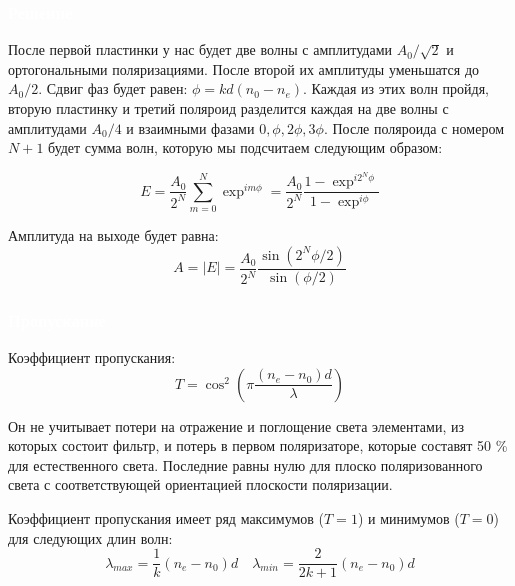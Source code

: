 \documentclass[aspectratio=169]{beamer}
\begin{document}
\begin{frame}
\frametitle{\textcolor{white}{Решение}}
После первой пластинки у нас будет две волны с амплитудами $A_0 /\sqrt2$ и ортогональными поляризациями. После второй их амплитуды уменьшатся до $A_0 / 2$. Сдвиг фаз будет равен: $\phi = kd(n_0 - n_e)$. Каждая из этих волн пройдя, вторую пластинку и третий поляроид разделится каждая на две волны с амплитудами $A_0 / 4$ и взаимными фазами $0, \phi, 2\phi, 3\phi$. После поляроида с номером $N+1$ будет сумма волн, которую мы подсчитаем следующим образом:

\begin{equation*}
    E = \frac{A_0}{2^N} \sum\limits_{m = 0}^N \exp^{i m \phi} = \frac{A_0}{2^N} \frac{1 - \exp^{i 2^N \phi}}{1 - \exp^{i \phi}}
\end{equation*}

Амплитуда на выходе будет равна: 
\begin{equation*}
    A = |E| = \frac{A_0}{2^N} \frac{\sin \left( 2^N \phi / 2 \right)}{\sin \left(\phi / 2 \right)}
\end{equation*}

\end{frame}

\begin{frame}
\frametitle{\textcolor{white}{Пропускание}}
Коэффициент пропускания:
\begin{equation*}
T = \cos^2 \left( \pi \frac{(n_e - n_0)d}{\lambda} \right)
\end{equation*}


Он не учитывает потери на отражение и поглощение света элементами, из которых состоит фильтр, и потерь в первом поляризаторе, которые составят 50 \% для естественного света. Последние равны нулю для плоско поляризованного света с соответствующей ориентацией плоскости поляризации.



Коэффициент пропускания имеет ряд максимумов ($T = 1$) и минимумов ($T = 0$) для следующих длин волн:
\begin{equation*}
    \lambda_{max} = \frac{1}{k} (n_e - n_0) d \quad
    \lambda_{min} = \frac{2}{2k + 1}(n_e - n_0) d
\end{equation*}

\end{frame}
\end{document}
